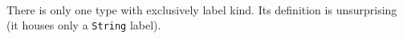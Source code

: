 \documentclass[authoryear, acmsmall, screen, review, nonacm]{acmart}
\begin{document}
\begin{code}%
\>[0]\AgdaSpace{}%
\AgdaSymbol{\{}\AgdaSpace{}%
\AgdaSymbol{=}\AgdaSpace{}%
\AgdaSymbol{\}}\AgdaSpace{}%
\AgdaSymbol{(}\AgdaSpace{}%
\AgdaSpace{}%
\AgdaSymbol{)}\AgdaSpace{}%
\AgdaSpace{}%
\AgdaSymbol{=}\AgdaSpace{}%
\AgdaSpace{}%
\AgdaSpace{}%
\AgdaSpace{}%
\AgdaSpace{}%
\AgdaSpace{}%
\AgdaSpace{}%
\<%
\\
\>[0]\AgdaSpace{}%
\AgdaSymbol{\{}\AgdaSpace{}%
\AgdaSymbol{=}\AgdaSpace{}%
\AgdaSymbol{\}}\AgdaSpace{}%
\AgdaSpace{}%
\AgdaSpace{}%
\AgdaSpace{}%
\AgdaSpace{}%
\AgdaSymbol{=}\AgdaSpace{}%
\AgdaSpace{}%
\AgdaSpace{}%
\AgdaSpace{}%
\AgdaSpace{}%
\<%
\\
\>[0]\AgdaSpace{}%
\AgdaSymbol{\{}\AgdaSpace{}%
\AgdaSymbol{=}\AgdaSpace{}%
\AgdaSymbol{\}}\AgdaSpace{}%
\AgdaSymbol{(}\AgdaSpace{}%
\AgdaSymbol{)}\AgdaSpace{}%
\AgdaSpace{}%
\AgdaSymbol{=}\AgdaSpace{}%
\AgdaSpace{}%
\AgdaSymbol{(}\AgdaSpace{}%
\AgdaSpace{}%
\AgdaSymbol{(}\AgdaSpace{}%
\AgdaSymbol{))}\<%
\\
\>[0]\AgdaSpace{}%
\AgdaSymbol{\{}\AgdaSpace{}%
\AgdaSymbol{=}\AgdaSpace{}%
\AgdaSymbol{\}}\AgdaSpace{}%
\AgdaSymbol{(}\AgdaSpace{}%
\AgdaSymbol{)}\AgdaSpace{}%
\AgdaSpace{}%
\AgdaSymbol{=}\AgdaSpace{}%
\AgdaSpace{}%
\AgdaSymbol{(}\AgdaSpace{}%
\AgdaSymbol{(}\AgdaSpace{}%
\AgdaSpace{}%
\AgdaSymbol{))}\<%
\end{code}


\Ni There is only one type with exclusively label kind. Its definition is unsurprising (it houses only a \verb!String! label).
\end{document}
